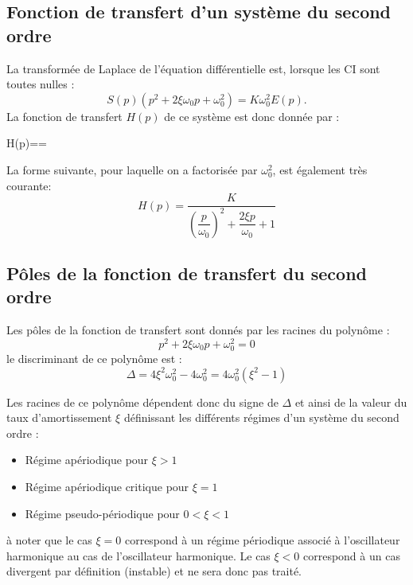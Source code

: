 \subsection{Fonction de transfert d'un système du second ordre}
La transformée de Laplace de l'équation différentielle est, lorsque les CI sont toutes nulles :
$$
S(p)\left(p^2+2\xi\omega_0p+\omega^2_0\right)=K\omega^2_0E(p).
$$
La fonction de transfert $H(p)$ de ce système est donc donnée par :
\begin{bequation}
    H(p)==\label{eq-2nd_ft}
\end{bequation}
La forme suivante, pour laquelle on a factorisée par $\omega^2_0$, est également très courante:
$$
H(p)=\dfrac{K}{\left(\dfrac{p}{\omega_0}\right)^2+\dfrac{2\xi p}{\omega_0}+1}
$$

\subsection{Pôles de la fonction de transfert du second ordre}
Les pôles de la fonction de transfert sont donnés par les racines du polynôme :
$$
p^2+2\xi\omega_0p+\omega_0^2 = 0
$$
le discriminant de ce polynôme est :
$$
\Delta=4\xi^2\omega^2_0-4\omega_0^2=4\omega_0^2(\xi^2-1)
$$

Les racines de ce polynôme dépendent donc du signe de $\Delta$ et ainsi de la valeur 
du taux d'amortissement $\xi$ définissant les différents régimes d'un système du second ordre :
\begin{itemize}
    \item Régime apériodique pour $\xi>1$
    \item Régime apériodique critique pour $\xi=1$
    \item Régime pseudo-périodique pour $0<\xi<1$
\end{itemize}
à noter que le cas $\xi=0$ correspond à un régime périodique associé à l'oscillateur harmonique 
au cas de l'oscillateur harmonique.
Le cas $\xi<0$ correspond à un cas divergent par définition (instable) et ne sera donc pas traité.


